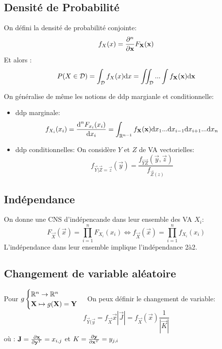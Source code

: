 \documentclass[main.tex]{subfiles}
\begin{document}
\subsection{Densité de Probabilité}
\begin{defin}
On défini la densité de probabilité conjointe:
\[
  f_X(x) = \derivp[^n]{\vec{x}} F_\vec{X}(\vec{x})
\]
Et alors :
\[
P(X\in\mathcal{D}) = \int_{\mathcal{D}}f_X(x)\d x = \iint_{\mathcal{D}} ... \int f_{\vec{X}}(\vec{x}) \d \vec{x}
\]
\end{defin}
\begin{defin}
  On généralise de même les notions de ddp margianle et conditionnelle:
  \begin{itemize}
  \item ddp marginale:
    \[
      f_{X_i}(x_i)= \frac{\d^n F_{x_i}(x_i)}{\d x_i} = \int_{\R^{n-1}}f_{\vec{X}}(\vec{x})\d x_1 ... \d x_{i-1}\d x_{i+1} ...\d x_n
    \]
  \item ddp conditionnelles:
    On considère $Y$ et $Z$ de VA vectorielles:
    \[
      f_{\vec{Y}|\vec{Z}=\vec{z}}(\vec{y}) = \frac{f_{\vec{YZ}}(\vec{y},\vec{z})}{f_{\vec{Z}(z)}}
    \]
  \end{itemize}
\end{defin}
\subsection{Indépendance}
\begin{thm}
  On donne une CNS d'indépencande dans leur ensemble des VA $X_i$:
  \[
    F_{\vec{X}}(\vec{x})= \prod_{i=1}^{n}F_{X_i}(x_i) \iff f_{\vec{X}}(\vec{x}) = \prod_{i=1}^{n}f_{X_i}(x_i)
  \]
  L'indépendance dans leur ensemble implique l'indépendance 2à2.
\end{thm}
\subsection{Changement de variable aléatoire}

\begin{prop}
  Pour $g
  \begin{cases}
    \R^n \to \R^n\\
    \vec{X} \mapsto g(\vec{X})=\vec{Y}
  \end{cases}$ On peux définir le changement de variable:
  \[
    f_{\vec{Y}(\vec{y}} =f_{\vec{X}}{\vec{x}}|\vec{J}| = f_{\vec{X}}(\vec{x}) \frac{1}{|\vec{K}|}
  \]
  où :
  $\vec{J} = \derivp[\vec{x}]{\vec{y}^T}=x_{i,j}$ et $K = \derivp[\vec{y}]{\vec{x}^T} =y_{j,i}$
\end{prop}
\end{document}
